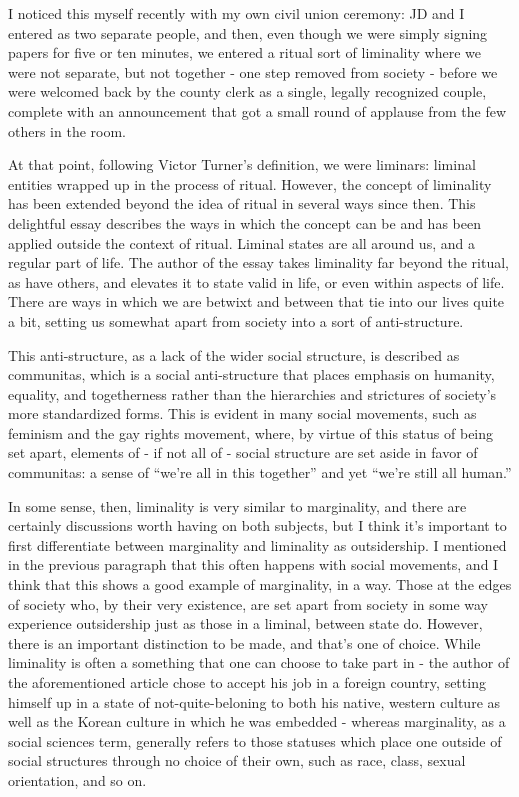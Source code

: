 I noticed this myself recently with my own civil union ceremony: JD and I entered as two separate people, and then, even though we were simply signing papers for five or ten minutes, we entered a ritual sort of liminality where we were not separate, but not together - one step removed from society - before we were welcomed back by the county clerk as a single, legally recognized couple, complete with an announcement that got a small round of applause from the few others in the room.

At that point, following Victor Turner's definition, we were liminars: liminal entities wrapped up in the process of ritual. However, the concept of liminality has been extended beyond the idea of ritual in several ways since then. This delightful essay describes the ways in which the concept can be and has been applied outside the context of ritual. Liminal states are all around us, and a regular part of life. The author of the essay takes liminality far beyond the ritual, as have others, and elevates it to state valid in life, or even within aspects of life. There are ways in which we are betwixt and between that tie into our lives quite a bit, setting us somewhat apart from society into a sort of anti-structure.

This anti-structure, as a lack of the wider social structure, is described as communitas, which is a social anti-structure that places emphasis on humanity, equality, and togetherness rather than the hierarchies and strictures of society's more standardized forms. This is evident in many social movements, such as feminism and the gay rights movement, where, by virtue of this status of being set apart, elements of - if not all of - social structure are set aside in favor of communitas: a sense of ``we're all in this together'' and yet ``we're still all human.''

In some sense, then, liminality is very similar to marginality, and there are certainly discussions worth having on both subjects, but I think it's important to first differentiate between marginality and liminality as outsidership. I mentioned in the previous paragraph that this often happens with social movements, and I think that this shows a good example of marginality, in a way. Those at the edges of society who, by their very existence, are set apart from society in some way experience outsidership just as those in a liminal, between state do. However, there is an important distinction to be made, and that's one of choice. While liminality is often a something that one can choose to take part in - the author of the aforementioned article chose to accept his job in a foreign country, setting himself up in a state of not-quite-beloning to both his native, western culture as well as the Korean culture in which he was embedded - whereas marginality, as a social sciences term, generally refers to those statuses which place one outside of social structures through no choice of their own, such as race, class, sexual orientation, and so on.

